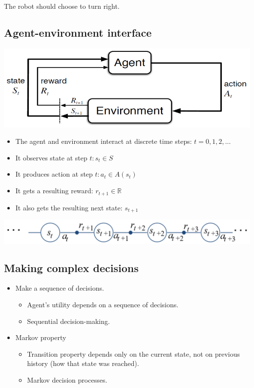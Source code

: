 \documentclass[11pt]{article}
\begin{document}
The robot should choose to turn right.

 \newpage
\subsection{Agent-environment interface}
\label{sec:orgda0e21e}
\begin{center}
\includegraphics[width=.9\linewidth]{./images/agent-environment-interface-flow-chart.png}
\end{center}
\begin{itemize}
\item The agent and environment interact at discrete time steps: \(t = 0, 1, 2, \ldots\)
\item It observes state at step \(t: s_t \in S\)
\item It produces action at step \(t: a_t \in A(s_t)\)
\item It gets a resulting reward: \(r_{t + 1} \in \mathbb{R}\)
\item It also gets the resulting next state: \(s_{t + 1}\)
\end{itemize}

\begin{center}
\includegraphics[width=.9\linewidth]{./images/agent-environment-interface-procedure.png}
\end{center}

 \newpage
\subsection{Making complex decisions}
\label{sec:orgfc024f9}
\begin{itemize}
\item Make a sequence of decisions.
\begin{itemize}
\item Agent's utility depends on a sequence of decisions.
\item Sequential decision-making.
\end{itemize}
\item Markov property
\begin{itemize}
\item Transition property depends only on the current state, not on previous history (how that state was reached).
\item Markov decision processes.
\end{itemize}
\end{itemize}
\end{document}
